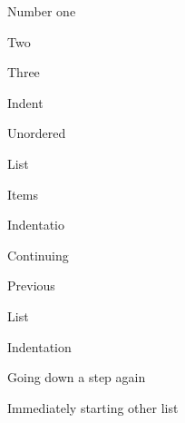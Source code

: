 \documentclass{article}
\begin{document}
  Number one

Two

Three

Indent



Unordered

List

Items

Indentatio



Continuing

Previous

List

Indentation

Going down a step again

Immediately starting other list
\end{document}
